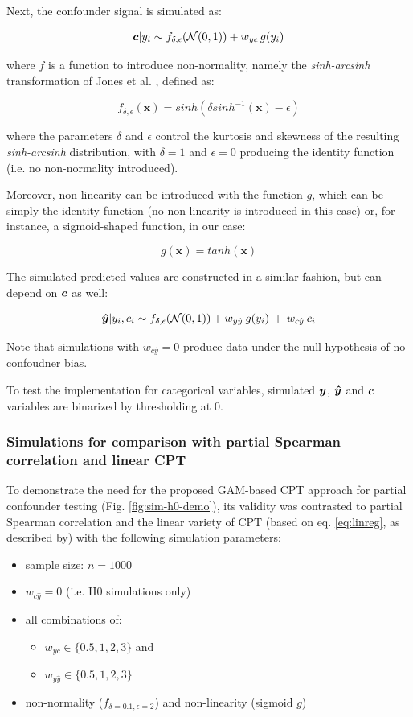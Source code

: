 \documentclass{article}
\begin{document}
Next, the confounder signal is simulated as:

$$ \boldsymbol{c} | y_i \sim f_{\delta, \epsilon}(\mathcal{N}(0, 1)) + w_{yc} \, g(y_i) $$

where $f$ is a function to introduce non-normality, namely the \emph{sinh-arcsinh} transformation of Jones et al. \cite{jones2009sinh}, defined as:

$$f_{\delta, \epsilon}(\boldsymbol{x}) = sinh(\delta sinh^{-1}(\boldsymbol{x}) - \epsilon)$$

where the parameters $\delta$ and $\epsilon$ control the kurtosis and skewness of the resulting \emph{sinh-arcsinh} distribution, with $\delta=1$ and $\epsilon=0$ producing the identity function (i.e. no non-normality introduced).

Moreover, non-linearity can be introduced with the function $g$, which can be simply the identity function (no non-linearity is introduced in this case) or, for instance, a sigmoid-shaped function, in our case:

$$ g(\boldsymbol{x}) = tanh(\boldsymbol{x}) $$


The simulated predicted values are constructed in a similar fashion, but can depend on $\boldsymbol{c}$ as well:

$$ \boldsymbol{\hat{y}} | y_i, c_i \sim f_{\delta, \epsilon}(\mathcal{N}(0, 1)) + w_{y\hat{y}} \: g(y_i) \, + \, w_{c\hat{y}} \: c_i$$

Note that simulations with $w_{c\hat{y}}=0$ produce data under the null hypothesis of no confoudner bias.

To test the implementation for categorical variables, simulated $\boldsymbol{y}$, $\boldsymbol{\hat{y}}$ and $\boldsymbol{c}$ variables are binarized by thresholding at 0.

\subsubsection*{Simulations for comparison with partial Spearman correlation and linear CPT}

To demonstrate the need for the proposed GAM-based CPT approach for partial confounder testing (Fig. \ref{fig:sim-h0-demo}), its validity was contrasted to partial Spearman correlation and the linear variety of CPT (based on eq. \ref{eq:linreg}, as described by\cite{berrett2020conditional}) with the following simulation parameters:
\begin{itemize}
    \item sample size: $n = 1000$
    \item $w_{c\hat{y}} = 0$ (i.e. H0 simulations only)
    \item all combinations of:
    \begin{itemize}
        \item $w_{yc} \in \{0.5, 1, 2, 3\}$ and
        \item $w_{y\hat{y}} \in \{0.5, 1, 2, 3\}$
    \end{itemize}
    \item non-normality ($f_{\delta = 0.1, \epsilon = 2}$) and non-linearity (sigmoid $g$)
\end{itemize}
\end{document}
